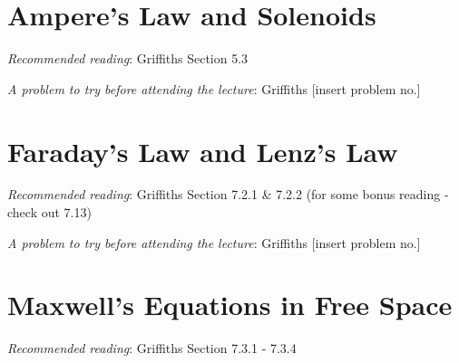 \documentclass[
  letterpaper,
  DIV=11,
  numbers=noendperiod]{scrreprt}
\begin{document}
\chapter{Ampere's Law and Solenoids}\label{amperes-law-and-solenoids}

\newcommand{\l}{\mathrm{\mathbf{l}}}
\newcommand{\E}{\mathrm{\mathbf{E}}}
\newcommand{\F}{\mathrm{\mathbf{F}}}
\newcommand{\r}{\mathrm{\mathbf{r}}}

\newcommand{\x}{\mathrm{\mathbf{x}}}
\newcommand{\y}{\mathrm{\mathbf{y}}}
\newcommand{\z}{\mathrm{\mathbf{z}}}

\emph{Recommended reading}: Griffiths Section 5.3

\emph{A problem to try before attending the lecture}: Griffiths
{[}insert problem no.{]}


\chapter{Faraday's Law and Lenz's Law}\label{faradays-law-and-lenzs-law}

\newcommand{\l}{\mathrm{\mathbf{l}}}
\newcommand{\E}{\mathrm{\mathbf{E}}}
\newcommand{\F}{\mathrm{\mathbf{F}}}
\newcommand{\r}{\mathrm{\mathbf{r}}}

\newcommand{\x}{\mathrm{\mathbf{x}}}
\newcommand{\y}{\mathrm{\mathbf{y}}}
\newcommand{\z}{\mathrm{\mathbf{z}}}

\emph{Recommended reading}: Griffiths Section 7.2.1 \& 7.2.2 (for some
bonus reading - check out 7.13)

\emph{A problem to try before attending the lecture}: Griffiths
{[}insert problem no.{]}


\chapter{Maxwell's Equations in Free
Space}\label{maxwells-equations-in-free-space}

\newcommand{\l}{\mathrm{\mathbf{l}}}
\newcommand{\E}{\mathrm{\mathbf{E}}}
\newcommand{\F}{\mathrm{\mathbf{F}}}
\newcommand{\r}{\mathrm{\mathbf{r}}}

\newcommand{\x}{\mathrm{\mathbf{x}}}
\newcommand{\y}{\mathrm{\mathbf{y}}}
\newcommand{\z}{\mathrm{\mathbf{z}}}

\emph{Recommended reading}: Griffiths Section 7.3.1 - 7.3.4

\end{document}
